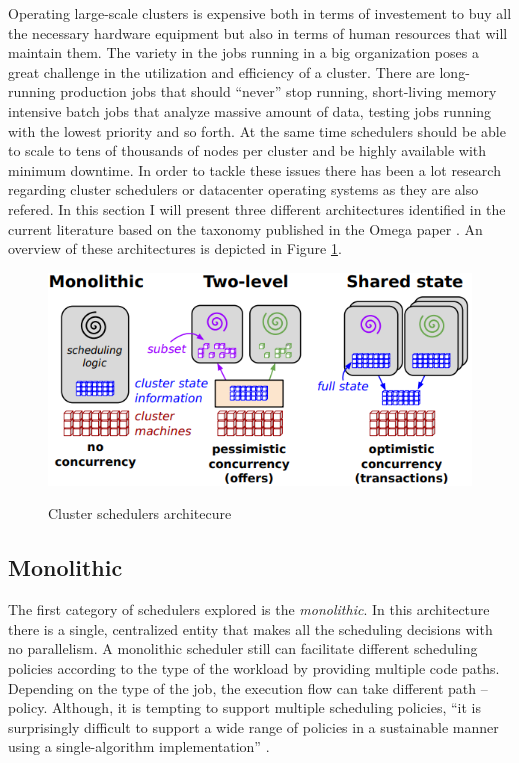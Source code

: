 Operating large-scale clusters is expensive both in terms of
investement to buy all the necessary hardware equipment but also in terms of
human resources that will maintain them. The variety in the jobs
running in a big organization poses a great challenge in the
utilization and efficiency of a cluster. There are long-running
production jobs that should ``never'' stop running, short-living
memory intensive batch jobs that analyze massive amount of data,
testing jobs running with the lowest priority and so forth. At the
same time schedulers should be able to scale to tens of thousands of
nodes per cluster and be highly available with minimum downtime. In order
to tackle these issues there has been a lot research regarding cluster
schedulers or datacenter operating systems as they are also
refered. In this section I will present three different architectures
identified in the current literature based on the taxonomy published
in the Omega paper \cite{41684}. An overview of these architectures is
depicted in Figure \ref{fig:sch_tax}.

\begin{figure}
\centering
\includegraphics[scale=0.6]{resources/images/Background/schedulers_taxonomy.png}
\label{fig:sch_tax}
\caption{Cluster schedulers architecure \cite{41684}}
\end{figure}

\subsection{Monolithic}
\label{ssec:tax_monolithic}
The first category of schedulers explored is the \emph{monolithic}. In
this architecture there is a single, centralized entity that makes all
the scheduling decisions with no parallelism. A monolithic scheduler
still can facilitate different scheduling policies according to the type
of the workload by providing multiple code paths. Depending on the
type of the job, the execution flow can take different path --
policy. Although, it is tempting to support multiple
scheduling policies, ``it is surprisingly difficult to support a wide
range of policies in a sustainable manner using a single-algorithm
implementation'' \cite{41684}.

